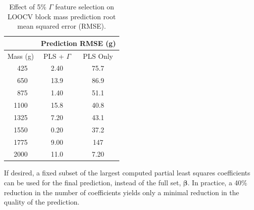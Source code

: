 \begin{table}[h]
\centering
\begin{tabular}{c|c|c|}
\cline{2-3}
\multicolumn{1}{l|}{}                  & \multicolumn{2}{c|}{Prediction RMSE (g)} \\ \hline
\multicolumn{1}{|c|}{Mass (g)} & PLS + $\Gamma$    & PLS Only   \\ \hline
\multicolumn{1}{|c|}{~425}           & 2.40              & 75.7         \\
\multicolumn{1}{|c|}{~650}           & 13.9              & 86.9         \\
\multicolumn{1}{|c|}{~875}           & 1.40              & 51.1         \\
\multicolumn{1}{|c|}{1100}           & 15.8              & 40.8         \\
\multicolumn{1}{|c|}{1325}           & 7.20              & 43.1         \\
\multicolumn{1}{|c|}{1550}           & 0.20              & 37.2         \\
\multicolumn{1}{|c|}{1775}           & 9.00              & 147         \\
\multicolumn{1}{|c|}{2000}           & 11.0              & 7.20         \\ \hline
\end{tabular}
\caption{Effect of 5\% $\Gamma$ feature selection on LOOCV block mass prediction root mean squared error (RMSE). }
\label{tbl:TVR_perf}
\end{table}


If desired, a fixed subset of the largest computed partial least squares coefficients can be used for the final prediction, instead of the full set, $\mathbf{\beta}$. 
In practice, a 40\% reduction in the number of coefficients yields only a minimal reduction in the quality of the prediction.

% 


